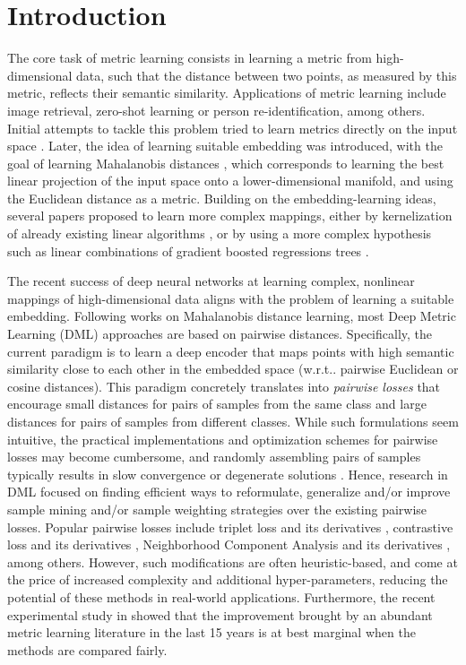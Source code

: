 \documentclass[runningheads]{llncs}
\makeatletter
\DeclareRobustCommand\onedot{\futurelet\@let@token\@onedot}
\def\@onedot{\ifx\@let@token.\else.\null\fi\xspace}
\def\wrt{w.r.t\onedot} \def\dof{d.o.f\onedot}
\makeatother
\begin{document}
 \section{Introduction}
The core task of metric learning consists in learning a metric from high-dimensional data, such that the distance between two points, as measured by this metric, reflects their semantic similarity. Applications of metric learning include image retrieval, zero-shot learning or person re-identification, among others. Initial attempts to tackle this problem tried to learn metrics directly on the input space \cite{lowe1995similarity}. Later, the idea of learning suitable embedding was introduced, with the goal of learning Mahalanobis distances \cite{xing2003distance, schultz2004learning, goldberger2005neighbourhood, weinberger2009distance, davis2007information}, which corresponds to learning the best linear projection of the input space onto a lower-dimensional manifold, and using the Euclidean distance as a metric. Building on the embedding-learning ideas, several papers proposed to learn more complex mappings, either by kernelization of already existing linear algorithms \cite{davis2007information}, or by using a more complex hypothesis such as linear combinations of gradient boosted regressions trees \cite{kedem2012non}.

The recent success of deep neural networks at learning complex,  nonlinear mappings of high-dimensional data aligns with the problem of learning a suitable embedding. Following works on Mahalanobis distance learning, most Deep Metric Learning (DML) approaches are based on pairwise distances. Specifically, the current paradigm is to learn a deep encoder 
that maps points with high semantic similarity
close to each other in the embedded space (\wrt pairwise Euclidean or cosine distances). 
This paradigm concretely translates into {\em pairwise losses} that encourage 
small distances for pairs of samples from the same class
and large distances for pairs of samples from different classes.
While such formulations seem intuitive, the practical implementations and optimization schemes for pairwise losses may become cumbersome, and randomly assembling pairs of samples typically results in slow convergence or degenerate solutions \cite{hermans2017defense}. Hence, research in DML focused on finding efficient ways to reformulate, generalize and/or improve sample mining and/or sample weighting strategies over the existing pairwise losses. Popular pairwise losses include triplet loss and its derivatives \cite{hermans2017defense, sohn2016improved, song2016deep, zheng2019hardness, ge2018deep}, contrastive loss and its derivatives \cite{hadsell2006dimensionality, wang2019multi}, Neighborhood Component Analysis and its derivatives \cite{goldberger2005neighbourhood, movshovitz2017no, wu2018improving}, among others. However, such modifications are often heuristic-based, and come at the price of increased complexity and additional hyper-parameters, reducing the potential of these methods in real-world applications. Furthermore, the recent experimental study in \cite{reality_check} showed that the improvement brought by an abundant metric learning literature in the last 15 years is at best marginal when the methods are compared fairly.
\end{document}
